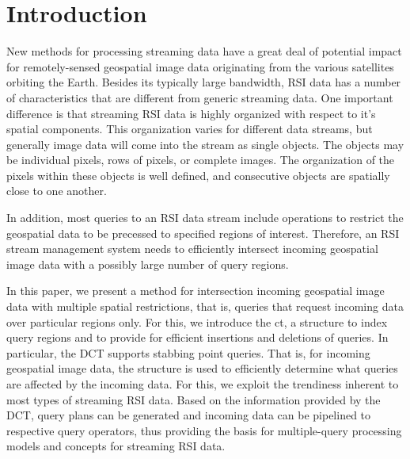\section{Introduction}
\label{sec:intro}

New methods for processing streaming data \cite{babcoc02model-issues,
  carney02monit-stream, heller00adapt-query} have a great deal of
potential impact for remotely-sensed geospatial image data originating
from the various satellites orbiting the Earth.  Besides its
typically large bandwidth, \acf{RSI} data has a number of
characteristics that are different from generic streaming data.  One
important difference is that streaming RSI data is highly organized
with respect to it's spatial components.  This organization varies for
different data streams, but generally image data will come into the
stream as single objects.  The objects may be individual pixels, rows
of pixels, or complete images.  The organization of the pixels within
these objects is well defined, and consecutive objects are spatially
close to one another.

In addition, most queries to an \ac{RSI} data stream include
operations to restrict the geospatial data to be precessed to
specified regions of interest.  Therefore, an RSI stream management
system needs to efficiently intersect incoming geospatial image
data with a possibly large number of query regions.

In this paper, we present a method for intersection incoming
geospatial image data with multiple spatial restrictions, that is,
queries that request incoming data over particular regions only. For
this, we introduce the \acf{ct}, a structure to index query regions
and to provide for efficient insertions and deletions of queries. In
particular, the DCT supports stabbing point queries. That is, for
incoming geospatial image data, the structure is used to efficiently
determine what queries are affected by the incoming data. For this, we
exploit the trendiness inherent to most types of streaming RSI data.
Based on the information provided by the DCT, query plans can be
generated and incoming data can be pipelined to respective query
operators, thus providing the basis for multiple-query processing models
and concepts for streaming RSI data.



